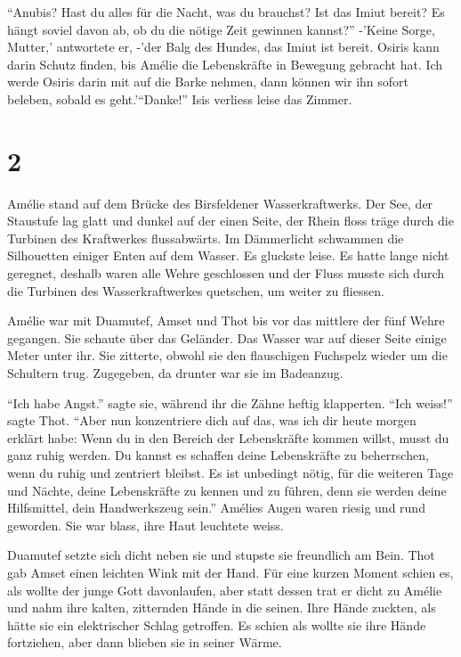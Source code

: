 \documentclass[11pt,titlepage,a5paper]{book}
\begin{document}
"`Anubis? Hast du alles für die Nacht, was du brauchst? Ist das Imiut bereit? Es hängt soviel davon ab, ob du die nötige Zeit gewinnen kannst?"' -'Keine Sorge, Mutter,' antwortete er, -'der Balg des Hundes, das Imiut ist bereit. Osiris kann darin Schutz finden, bis Amélie die Lebenskräfte in Bewegung gebracht hat. Ich werde Osiris darin mit auf die Barke nehmen, dann können wir ihn sofort beleben, sobald es geht.'"`Danke!"' Isis verliess leise das Zimmer.

\section*{2}

Amélie stand auf dem Brücke des Birsfeldener Wasserkraftwerks. Der See, der Staustufe lag glatt und dunkel auf der einen Seite, der Rhein floss träge durch die Turbinen des Kraftwerkes flussabwärts. Im Dämmerlicht schwammen die Silhouetten einiger Enten auf dem Wasser. Es gluckste leise. Es hatte lange nicht geregnet, deshalb waren alle Wehre geschlossen und der Fluss musste sich durch die Turbinen des Wasserkraftwerkes quetschen, um weiter zu fliessen.

Amélie war mit Duamutef, Amset und Thot bis vor das mittlere der fünf Wehre gegangen. Sie schaute über das Geländer. Das Wasser war auf dieser Seite einige Meter unter ihr. Sie zitterte, obwohl sie den flauschigen Fuchspelz wieder um die Schultern trug. Zugegeben, da drunter war sie im Badeanzug.

"`Ich habe Angst."' sagte sie, während ihr die Zähne heftig klapperten. "`Ich weiss!"' sagte Thot. "`Aber nun konzentriere dich auf das, was ich dir heute morgen erklärt habe: Wenn du in den Bereich der Lebenskräfte kommen willst, musst du ganz ruhig werden. Du kannst es schaffen deine Lebenskräfte zu beherrschen, wenn du ruhig und zentriert bleibst. Es ist unbedingt nötig, für die weiteren Tage und Nächte, deine Lebenskräfte zu kennen und zu führen, denn sie werden deine Hilfsmittel, dein Handwerkszeug sein."' Amélies Augen waren riesig und rund geworden. Sie war blass, ihre Haut leuchtete weiss. 

Duamutef setzte sich dicht neben sie und stupste sie freundlich am Bein. Thot gab Amset einen leichten Wink mit der Hand. Für eine kurzen Moment schien es, als wollte der junge Gott davonlaufen, aber statt dessen trat er dicht zu Amélie und nahm ihre kalten, zitternden Hände in die seinen. Ihre Hände zuckten, als hätte sie ein elektrischer Schlag getroffen. Es schien als wollte sie ihre Hände fortziehen, aber dann blieben sie in seiner Wärme.
\end{document}
